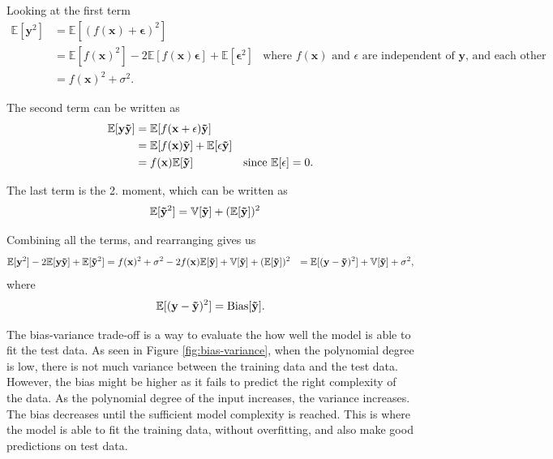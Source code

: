 Looking at the first term
\begin{align*}
    \mathbb{E} [ \mathbf{y}^{2} ] &= \mathbb{E} [ ( f(\mathbf{x}) + \mathbf{\epsilon} )^{2} ] \\
    &= \mathbb{E} [ f(\mathbf{x})^{2} ] - 2 \mathbb{E} [ f(\mathbf{x}) \mathbf{\epsilon} ] + \mathbb{E} [ \mathbf{\epsilon}^{2} ] & \text{where $f(\mathbf{x})$ and $\epsilon$ are independent of $\mathbf{y}$, and each other} \\
    &= f(\mathbf{x})^{2} + \sigma^{2} .
\end{align*}

The second term can be written as 
\begin{align*}
    \mathbb{E} [ \mathbf{y} \mathbf{\Tilde{y}} ] &= \mathbb{E} [ f(\mathbf{x} + \mathbf{\epsilon}) \mathbf{\Tilde{y}} ] \\
    &= \mathbb{E} [ f(\mathbf{x}) \mathbf{\Tilde{y}} ] + \mathbb{E} [ \epsilon \mathbf{\Tilde{y}} ] \\
    &=  f(\mathbf{x}) \mathbb{E} [ \mathbf{\Tilde{y}} ] & \text{since $\mathbb{E}[\mathbf{\epsilon}] = 0$} .
\end{align*}

The last term is the 2. moment, which can be written as 
\begin{align*}
    \mathbb{E} [ \mathbf{\Tilde{y}}^{2} ] &= \mathbb{V}[\mathbf{\Tilde{y}}] + (\mathbb{E} [ \mathbf{\Tilde{y}} ])^{2} 
\end{align*}

Combining all the terms, and rearranging gives us
\begin{align*}
    \mathbb{E} [ \mathbf{y}^{2} ] - 2 \mathbb{E} [ \mathbf{y} \mathbf{\Tilde{y}} ] + \mathbb{E} [ \mathbf{\Tilde{y}}^{2} ] &= f(\mathbf{x})^{2} + \sigma^{2} - 2 f(\mathbf{x}) \mathbb{E} [ \mathbf{\Tilde{y}} ] + \mathbb{V}[\mathbf{\Tilde{y}}] + (\mathbb{E} [ \mathbf{\Tilde{y}} ])^{2} 
    &= \mathbb{E} [ (\mathbf{y} - \mathbf{\Tilde{y}})^{2} ] + \mathbb{V}[\mathbf{\Tilde{y}}] + \sigma^{2} , 
\end{align*}
where 
\begin{align*}
    \mathbb{E} [ (\mathbf{y} - \mathbf{\Tilde{y}})^{2} ] = \text{Bias}[\mathbf{\Tilde{y}}]. 
\end{align*}

The bias-variance trade-off is a way to evaluate the how well the model is able to fit the test data. As seen in Figure \ref{fig:bias-variance}, when the polynomial degree is low, there is not much variance between the training data and the test data. However, the bias might be higher as it fails to predict the right complexity of the data. As the polynomial degree of the input increases, the variance increases. The bias decreases until the sufficient model complexity is reached. This is where the model is able to fit the training data, without overfitting, and also make good predictions on test data. 


